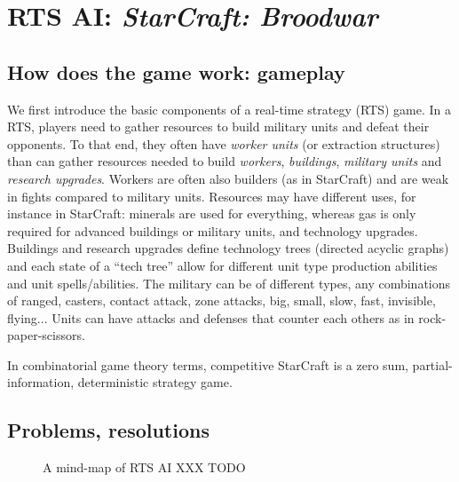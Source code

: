 \chapter{RTS AI: \textit{StarCraft: Broodwar}}

\section{How does the game work: gameplay}
We first introduce the basic components of a real-time strategy (RTS) game. In a RTS, players need to gather resources to build military units and defeat their opponents. To that end, they often have \textit{worker units} (or extraction structures) than can gather resources needed to build \textit{workers}, \textit{buildings}, \textit{military units} and \textit{research upgrades}. Workers are often also builders (as in StarCraft) and are weak in fights compared to military units. Resources may have different uses, for instance in StarCraft: minerals are used for everything, whereas gas is only required for advanced buildings or military units, and technology upgrades. Buildings and research upgrades define technology trees (directed acyclic graphs) and each state of a ``tech tree'' allow for different unit type production abilities and unit spells/abilities. The military can be of different types, any combinations of ranged, casters, contact attack, zone attacks, big, small, slow, fast, invisible, flying... Units can have attacks and defenses that counter each others as in rock-paper-scissors. 

In combinatorial game theory terms, competitive StarCraft is a zero sum, partial-information, deterministic strategy game.

\section{Problems, resolutions}

\begin{figure}[!ht]
\begin{center}
\end{center}
\label{fig:mindmapRTS}
\caption{A mind-map of RTS AI XXX TODO}
\end{figure}

